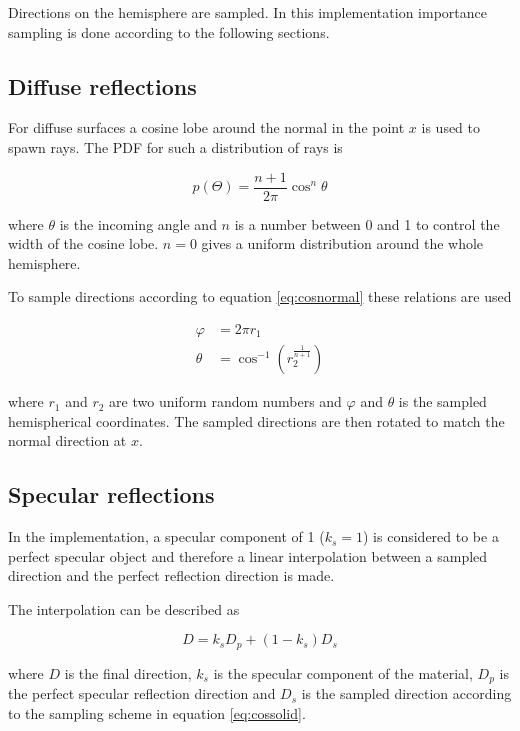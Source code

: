 \documentclass[a4paper]{report}
\begin{document}
Directions on the hemisphere are sampled. In this
implementation importance sampling is done according to the following sections.

\subsection{Diffuse reflections}
For diffuse surfaces a cosine lobe around the normal in the point
\(x\) is used to spawn rays. The PDF for such a distribution of rays
is 

\begin{equation}
  p(\Theta) = \frac{n+1}{2\pi}\cos^n{\theta}
  \label{eq:cosnormal}
\end{equation}

where \(\theta\) is the incoming angle and \(n\) is a number between 0
and 1 to control the width of the cosine lobe. \(n=0\) gives a uniform
distribution around the whole hemisphere.

To sample directions according to equation \ref{eq:cosnormal} these
relations are used

\begin{align}
  \varphi &= 2 \pi r_1 \nonumber \\
  \theta &= \cos^{-1}(r_2^{\frac{1}{n+1}})
\end{align}

where \(r_1\) and \(r_2\) are two uniform random numbers and
\(\varphi\) and \(\theta\) is the sampled hemispherical coordinates. The sampled
directions are then rotated to match the normal direction at \(x\).

\subsection{Specular reflections}

In the implementation, a specular component of 1 (\(k_s=1\)) is considered to be a
perfect specular object and therefore a linear interpolation between a
sampled direction and the perfect reflection direction is made.

The interpolation can be described as

\begin{equation}
  D = k_sD_p + (1-k_s)D_s
\end{equation}

where \(D\) is the final direction, \(k_s\) is the specular
component of the material, \(D_p\) is the perfect specular reflection
direction and \(D_s\) is the sampled direction according to the
sampling scheme in equation \ref{eq:cossolid}.
\end{document}
